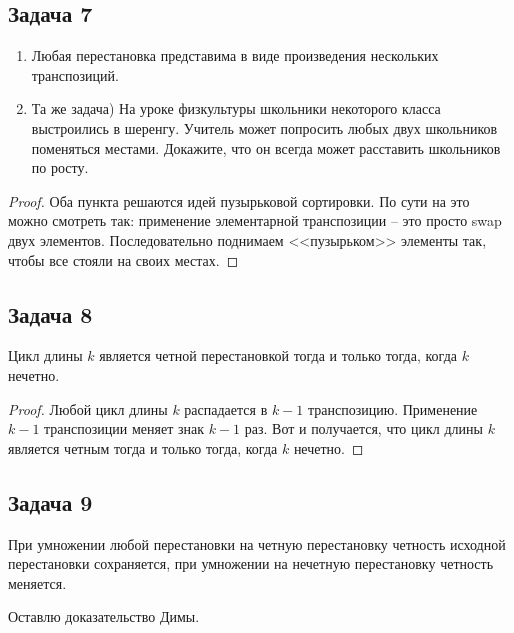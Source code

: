 \subsection{Задача 7}

\begin{enumerate}[label=\asbuk*)]
\item Любая перестановка представима в виде произведения нескольких транспозиций.
\item Та же задача) На уроке физкультуры школьники некоторого класса выстроились
в шеренгу. Учитель может попросить любых двух школьников поменяться местами.
Докажите, что он всегда может расставить школьников по росту.
\end{enumerate}

\begin{proof}
Оба пункта решаются идей пузырьковой сортировки. По сути на это можно смотреть так: применение элементарной транспозиции -- это просто swap двух элементов. Последовательно поднимаем <<пузырьком>> элементы так, чтобы все стояли на своих местах.
\end{proof}

\subsection{Задача 8}
Цикл длины $k$ является четной перестановкой тогда и только тогда, когда $k$ нечетно.

\begin{proof}
Любой цикл длины $k$ распадается в $k-1$ транспозицию. Применение $k-1$ транспозиции меняет знак $k-1$ раз. Вот и получается, что цикл длины $k$ является четным тогда и только тогда, когда $k$ нечетно.
\end{proof}

\subsection{Задача 9}

При умножении любой перестановки на четную перестановку четность исходной перестановки сохраняется, при умножении на нечетную перестановку четность меняется.

Оставлю доказательство Димы.


